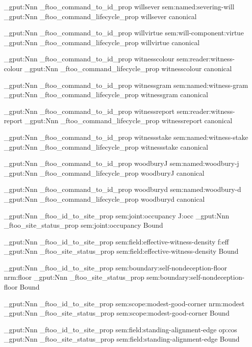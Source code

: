 \prop_gput:Nnn \g_ftoo_command_to_id_prop { willsever } { sem:named:severing-will }
\prop_gput:Nnn \g_ftoo_command_lifecycle_prop { willsever } { canonical }


\prop_gput:Nnn \g_ftoo_command_to_id_prop { willvirtue } { sem:will-component:virtue }
\prop_gput:Nnn \g_ftoo_command_lifecycle_prop { willvirtue } { canonical }


\prop_gput:Nnn \g_ftoo_command_to_id_prop { witnesscolour } { sem:reader:witness-colour }
\prop_gput:Nnn \g_ftoo_command_lifecycle_prop { witnesscolour } { canonical }


\prop_gput:Nnn \g_ftoo_command_to_id_prop { witnessgram } { sem:named:witness-gram }
\prop_gput:Nnn \g_ftoo_command_lifecycle_prop { witnessgram } { canonical }


\prop_gput:Nnn \g_ftoo_command_to_id_prop { witnessreport } { sem:reader:witness-report }
\prop_gput:Nnn \g_ftoo_command_lifecycle_prop { witnessreport } { canonical }


\prop_gput:Nnn \g_ftoo_command_to_id_prop { witnessstake } { sem:named:witness-stake }
\prop_gput:Nnn \g_ftoo_command_lifecycle_prop { witnessstake } { canonical }


\prop_gput:Nnn \g_ftoo_command_to_id_prop { woodburyJ } { sem:named:woodbury-j }
\prop_gput:Nnn \g_ftoo_command_lifecycle_prop { woodburyJ } { canonical }


\prop_gput:Nnn \g_ftoo_command_to_id_prop { woodburyd } { sem:named:woodbury-d }
\prop_gput:Nnn \g_ftoo_command_lifecycle_prop { woodburyd } { canonical }




\prop_gput:Nnn \g_ftoo_id_to_site_prop { sem:joint:occupancy } { J:occ }
\prop_gput:Nnn \g_ftoo_site_status_prop { sem:joint:occupancy } { Bound }

\prop_gput:Nnn \g_ftoo_id_to_site_prop { sem:field:effective-witness-density } { f:eff }
\prop_gput:Nnn \g_ftoo_site_status_prop { sem:field:effective-witness-density } { Bound }

\prop_gput:Nnn \g_ftoo_id_to_site_prop { sem:boundary:self-nondeception-floor } { nrm:floor }
\prop_gput:Nnn \g_ftoo_site_status_prop { sem:boundary:self-nondeception-floor } { Bound }

\prop_gput:Nnn \g_ftoo_id_to_site_prop { sem:scope:modest-good-corner } { nrm:modest }
\prop_gput:Nnn \g_ftoo_site_status_prop { sem:scope:modest-good-corner } { Bound }

\prop_gput:Nnn \g_ftoo_id_to_site_prop { sem:field:standing-alignment-edge } { op:cos }
\prop_gput:Nnn \g_ftoo_site_status_prop { sem:field:standing-alignment-edge } { Bound }

